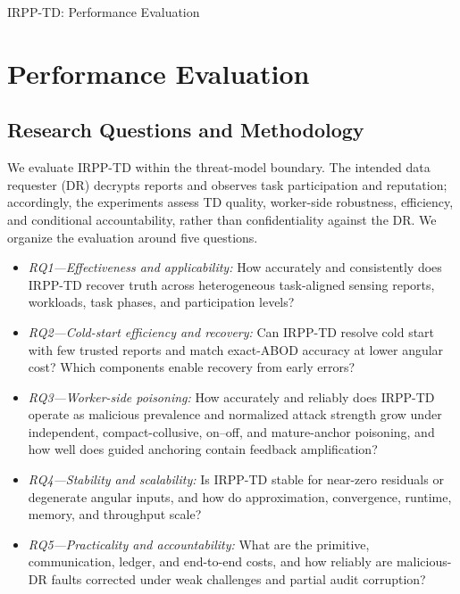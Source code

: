 \documentclass[journal]{IEEEtran}
\begin{document}
%
{IRPP-TD: Performance Evaluation}
\setcounter{section}{6}

\section{Performance Evaluation}
\label{sec:performance-evaluation}

\subsection{Research Questions and Methodology}
\label{sec:experimental-methodology}

We evaluate IRPP-TD within the threat-model boundary. The intended data
requester (DR) decrypts reports and observes task participation and reputation;
accordingly, the experiments assess TD quality, worker-side robustness,
efficiency, and conditional accountability, rather than confidentiality
against the DR. We organize the evaluation around five questions.

\begin{itemize}
  \setlength{\itemsep}{0.15ex}
  \setlength{\topsep}{0.3ex}
  \setlength{\parsep}{0pt}
  \item \emph{RQ1---Effectiveness and applicability:} How accurately and
  consistently does IRPP-TD recover truth across heterogeneous task-aligned
  sensing reports, workloads, task phases, and participation levels?
  \item \emph{RQ2---Cold-start efficiency and recovery:} Can IRPP-TD resolve
  cold start with few trusted reports and match exact-ABOD accuracy at lower
  angular cost? Which components enable recovery from early errors?
  \item \emph{RQ3---Worker-side poisoning:} How accurately and reliably does
  IRPP-TD operate as malicious prevalence and normalized attack strength grow
  under independent, compact-collusive, on--off, and mature-anchor poisoning,
  and how well does guided anchoring contain feedback amplification?
  \item \emph{RQ4---Stability and scalability:} Is IRPP-TD stable for near-zero
  residuals or degenerate angular inputs, and how do approximation, convergence,
  runtime, memory, and throughput scale?
  \item \emph{RQ5---Practicality and accountability:} What are the primitive,
  communication, ledger, and end-to-end costs, and how reliably are malicious-DR
  faults corrected under weak challenges and partial audit corruption?
\end{itemize}
\end{document}
